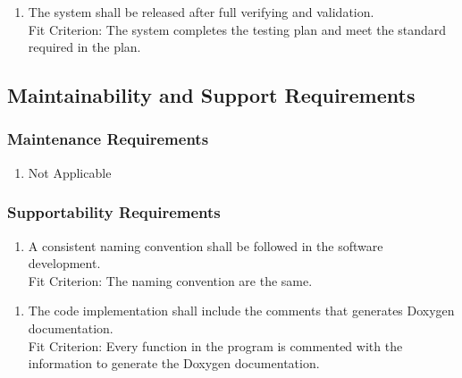 \documentclass[12pt, titlepage]{article}
\begin{document}
\begin{enumerate}[{OE}5. ]
	\item The system shall be released after full verifying and validation.
	\\
	
	Fit Criterion: The system completes the testing plan and meet the standard required in the plan.
\end{enumerate}


\subsection{Maintainability and Support Requirements}
\label{sub:maintainability_and_support_requirements}

\subsubsection{Maintenance Requirements}
\label{ssub:maintenance_requirements}
\begin{enumerate}[{MS}1. ]
	\item Not Applicable
\end{enumerate}

\subsubsection{Supportability Requirements}
\label{ssub:supportability_requirements}
\begin{enumerate}[{MS}2. ]
	\item A consistent naming convention shall be followed in the software development.
	\\
	
	Fit Criterion: The naming convention are the same.
	
\end{enumerate}

\begin{enumerate}[{MS}3. ]
	\item The code implementation shall include the comments that generates Doxygen documentation.
	\\
	
	Fit Criterion: Every function in the program is commented with the information to generate the Doxygen documentation.
\end{enumerate}
\end{document}
